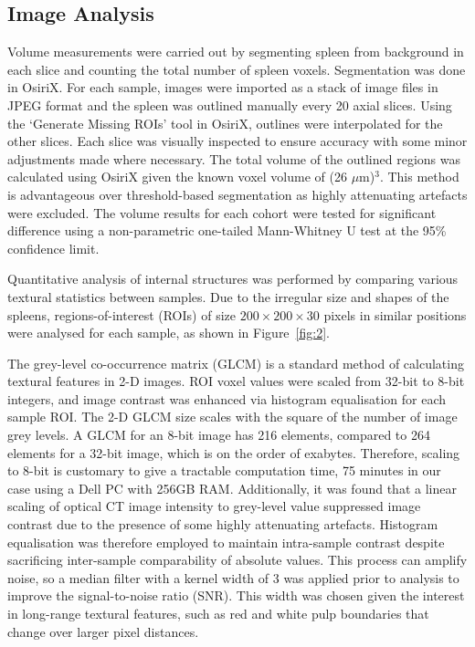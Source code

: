 \documentclass[12pt]{article}
\begin{document}
\subsection{Image Analysis}
Volume measurements were carried out by segmenting spleen from background in each slice and counting the total number of spleen voxels. Segmentation was done in OsiriX. \cite{rossetosirix:2004}  For each sample, images were imported as a stack of image files in JPEG format and the spleen was outlined manually every 20 axial slices. Using the `Generate Missing ROIs' tool in OsiriX, outlines were interpolated for the other slices. Each slice was visually inspected to ensure accuracy with some minor adjustments made where necessary. The total volume of the outlined regions was calculated using OsiriX given the known voxel volume of (26 $\mu$m)$^3$. This method is advantageous over threshold-based segmentation as highly attenuating artefacts were excluded. The volume results for each cohort were tested for significant difference using a non-parametric one-tailed Mann-Whitney U test at the 95\% confidence limit.

Quantitative analysis of internal structures was performed by comparing various textural statistics between samples. Due to the irregular size and shapes of the spleens, regions-of-interest (ROIs) of size $200 \times 200 \times 30$ pixels in similar positions were analysed for each sample, as shown in Figure~\ref{fig:2}. 

The grey-level co-occurrence matrix (GLCM) is a standard method of calculating textural features in 2-D images. \cite{haralicktextural1973} ROI voxel values were scaled from 32-bit to 8-bit integers, and image contrast was enhanced via histogram equalisation for each sample ROI. The 2-D GLCM size scales with the square of the number of image grey levels. A GLCM for an 8-bit image has 216 elements, compared to 264 elements for a 32-bit image, which is on the order of exabytes. Therefore, scaling to 8-bit is customary to give a tractable computation time, 75 minutes in our case using a Dell PC with 256GB RAM. Additionally, it was found that a linear scaling of optical CT image intensity to grey-level value suppressed image contrast due to the presence of some highly attenuating artefacts. Histogram equalisation was therefore employed to maintain intra-sample contrast despite sacrificing inter-sample comparability of absolute values. This process can amplify noise, so a median filter with a kernel width of 3 was applied prior to analysis to improve the signal-to-noise ratio (SNR). This width was chosen given the interest in long-range textural features, such as red and white pulp boundaries that change over larger pixel distances.
\end{document}
